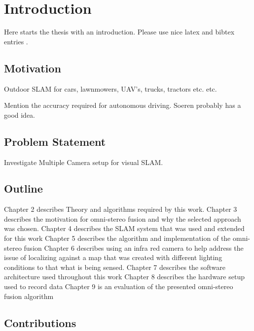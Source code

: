\chapter{Introduction}
\label{chapter:Introduction}

Here starts the thesis with an introduction. Please use nice latex and bibtex entries \cite{latex}. 

\section{Motivation}

Outdoor SLAM for cars, lawnmowers, UAV's, trucks, tractors etc. etc.

Mention the accuracy required for autonomous driving.  Soeren probably has a good idea.

\section{Problem Statement}

Investigate Multiple Camera setup for visual SLAM.

\section{Outline}
 
Chapter 2 describes Theory and algorithms required by this work.  \newline
Chapter 3 describes the motivation for omni-stereo fusion and why the selected approach was chosen.
\newline
Chapter 4 describes the SLAM system that was used and extended for this work \newline
Chapter 5 describes the algorithm and implementation of the omni-stereo fusion \newline
Chapter 6 describes using an infra red camera to help address the issue of localizing against a map
that was created with different lighting conditions to that what is being sensed.\newline
Chapter 7 describes the software architecture used throughout this work \newline
Chapter 8 describes the hardware setup used to record data \newline
Chapter 9 is an evaluation of the presented omni-stereo fusion algorithm \newline

\section{Contributions}

